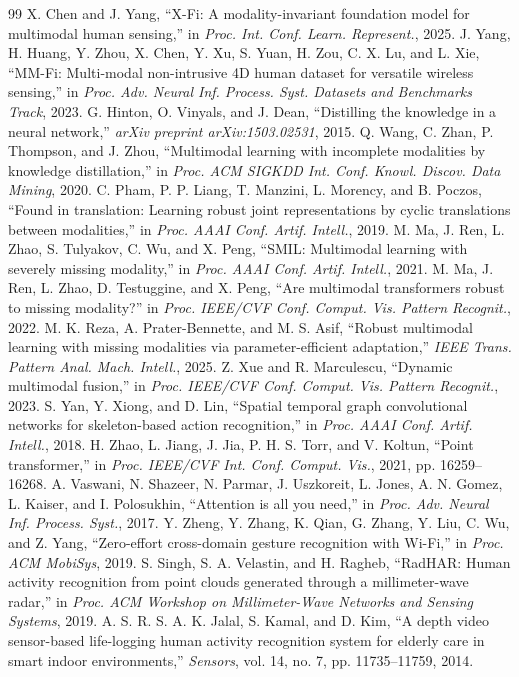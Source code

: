 \documentclass[journal, twocolumn, transmag]{IEEEtran}
\begin{document}
\begin{thebibliography}{99}
	 X. Chen and J. Yang, ``X-Fi: A modality-invariant foundation model for multimodal human sensing,'' in \textit{Proc. Int. Conf. Learn. Represent.}, 2025.
	 J. Yang, H. Huang, Y. Zhou, X. Chen, Y. Xu, S. Yuan, H. Zou, C. X. Lu, and L. Xie, ``MM-Fi: Multi-modal non-intrusive 4D human dataset for versatile wireless sensing,'' in \textit{Proc. Adv. Neural Inf. Process. Syst. Datasets and Benchmarks Track}, 2023.
	 G. Hinton, O. Vinyals, and J. Dean, ``Distilling the knowledge in a neural network,'' \textit{arXiv preprint arXiv:1503.02531}, 2015.
	 Q. Wang, C. Zhan, P. Thompson, and J. Zhou, ``Multimodal learning with incomplete modalities by knowledge distillation,'' in \textit{Proc. ACM SIGKDD Int. Conf. Knowl. Discov. Data Mining}, 2020.
	 C. Pham, P. P. Liang, T. Manzini, L. Morency, and B. Poczos, ``Found in translation: Learning robust joint representations by cyclic translations between modalities,'' in \textit{Proc. AAAI Conf. Artif. Intell.}, 2019.
	 M. Ma, J. Ren, L. Zhao, S. Tulyakov, C. Wu, and X. Peng, ``SMIL: Multimodal learning with severely missing modality,'' in \textit{Proc. AAAI Conf. Artif. Intell.}, 2021.
	 M. Ma, J. Ren, L. Zhao, D. Testuggine, and X. Peng, ``Are multimodal transformers robust to missing modality?'' in \textit{Proc. IEEE/CVF Conf. Comput. Vis. Pattern Recognit.}, 2022.
	 M. K. Reza, A. Prater-Bennette, and M. S. Asif, ``Robust multimodal learning with missing modalities via parameter-efficient adaptation,'' \textit{IEEE Trans. Pattern Anal. Mach. Intell.}, 2025.
	 Z. Xue and R. Marculescu, ``Dynamic multimodal fusion,'' in \textit{Proc. IEEE/CVF Conf. Comput. Vis. Pattern Recognit.}, 2023.
	 S. Yan, Y. Xiong, and D. Lin, ``Spatial temporal graph convolutional networks for skeleton-based action recognition,'' in \textit{Proc. AAAI Conf. Artif. Intell.}, 2018.
	 H. Zhao, L. Jiang, J. Jia, P. H. S. Torr, and V. Koltun, ``Point transformer,'' in \textit{Proc. IEEE/CVF Int. Conf. Comput. Vis.}, 2021, pp. 16259--16268.
	 A. Vaswani, N. Shazeer, N. Parmar, J. Uszkoreit, L. Jones, A. N. Gomez, L. Kaiser, and I. Polosukhin, ``Attention is all you need,'' in \textit{Proc. Adv. Neural Inf. Process. Syst.}, 2017.
	 Y. Zheng, Y. Zhang, K. Qian, G. Zhang, Y. Liu, C. Wu, and Z. Yang, ``Zero-effort cross-domain gesture recognition with Wi-Fi,'' in \textit{Proc. ACM MobiSys}, 2019.
	 S. Singh, S. A. Velastin, and H. Ragheb, ``RadHAR: Human activity recognition from point clouds generated through a millimeter-wave radar,'' in \textit{Proc. ACM Workshop on Millimeter-Wave Networks and Sensing Systems}, 2019.
	 A. S. R. S. A. K. Jalal, S. Kamal, and D. Kim, ``A depth video sensor-based life-logging human activity recognition system for elderly care in smart indoor environments,'' \textit{Sensors}, vol. 14, no. 7, pp. 11735--11759, 2014.
\end{thebibliography}

\clearpage
\mbox{}
\thispagestyle{empty}
\clearpage
\end{document}

